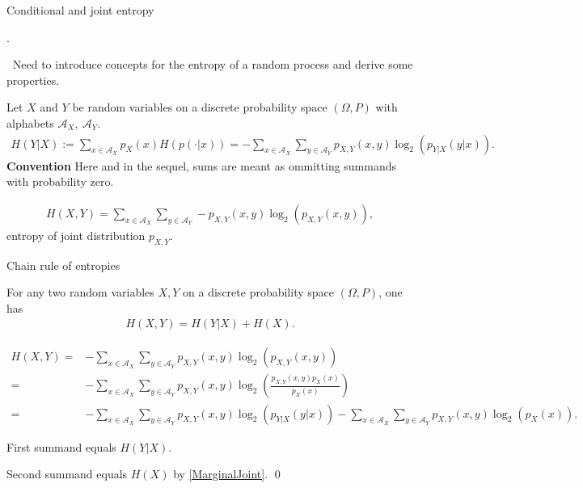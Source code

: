 \begin{frame}{Conditional and joint entropy}

.

\iarrow$\:$ Need to introduce concepts for the entropy of a random process and derive some properties. 

\vskip 4pt 
Let $X$ and $Y$ be random variables on a discrete probability space $(\Omega,P)$ with alphabets $\mathcal{A}_X,\:\mathcal{A}_Y$. 
\vskip 1pt
\begin{align*}
H(Y|X):=\sum_{x\in\mathcal{A}_X}p_X(x)H(p(\cdot|x))=-\sum_{x\in\mathcal{A}_X }\sum_{y\in\mathcal{A}_Y}p_{X,Y}(x,y)\log_2(p_{Y|X}(y|x)).
\end{align*}
\textbf{Convention} Here and in the sequel, sums are meant as ommitting summands with probability zero. 

\begin{align*}
H(X,Y)=\sum_{x\in\mathcal{A}_X}\sum_{y\in\mathcal{A}_Y}-p_{X,Y}(x,y)\log_2(p_{X,Y}(x,y)),
\end{align*}
entropy of joint distribution $p_{X,Y}$.
\end{frame}


\begin{frame}{Chain rule of entropies}
\begin{proposition}
For any two random variables $X,Y$ on a discrete probability space $(\Omega,P)$, one has
\begin{align*}
H(X,Y)=H(Y|X)+H(X).
\end{align*}
\end{proposition}
\begin{align*}
H(X,Y)=&-\sum_{x\in \mathcal{A}_X}\sum_{y\in\mathcal{A}_Y}p_{X,Y}(x,y)\log_2\left(p_{X,Y}(x,y)\right)\\
=&-\sum_{x\in \mathcal{A}_X}\sum_{y\in\mathcal{A}_Y}p_{X,Y}(x,y)\log_2\left(\frac{p_{X,Y}(x,y)p_X(x)}{p_X(x)}\right)\\
=&-\sum_{x\in \mathcal{A}_X}\sum_{y\in\mathcal{A}_Y}p_{X,Y}(x,y)\log_2\left(p_{Y|X}(y|x)\right)-\sum_{x\in \mathcal{A}_X}\sum_{y\in\mathcal{A}_Y}p_{X,Y}(x,y)\log_2(p_X(x)).
\end{align*}
\smallskip
\bit 
\item First summand equals $H(Y|X)$.
\item Second summand equals $H(X)$ by \eqref{MarginalJoint}. \qed
\eit 
\end{frame}







